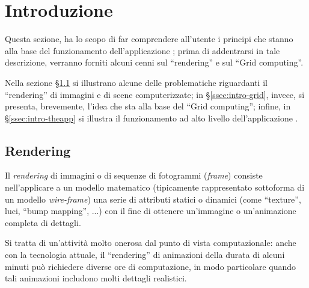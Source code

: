 
\section{Introduzione} \label{sec:intro}

Questa sezione, ha lo scopo di far comprendere all'utente i principi che stanno alla base del funzionamento dell'applicazione \mgTheApp{}; prima di addentrarsi in tale descrizione, verranno forniti alcuni cenni sul ``rendering'' e sul ``Grid computing''.

Nella sezione \S \ref{ssec:intro-render} si illustrano alcune delle problematiche riguardanti il ``rendering'' di immagini e di scene computerizzate; in \S \ref{ssec:intro-grid}, invece, si presenta, brevemente, l'idea che sta alla base del ``Grid computing''; infine, in \S \ref{ssec:intro-theapp} si illustra il funzionamento ad alto livello dell'applicazione \mgTheApp{}.

\subsection{Rendering} \label{ssec:intro-render}

Il \emph{rendering} di immagini o di sequenze di fotogrammi (\emph{frame}) consiste nell'applicare a un modello matematico (tipicamente rappresentato sottoforma di un modello \emph{wire-frame}) una serie di attributi statici o dinamici (come ``texture'', luci, ``bump mapping'', ...) con il fine di ottenere un'immagine o un'animazione completa di dettagli.

Si tratta di un'attivit\`a molto onerosa dal punto di vista computazionale: anche con la tecnologia attuale, il ``rendering'' di animazioni della durata di alcuni minuti pu\`o richiedere diverse ore di computazione, in modo particolare quando tali animazioni includono molti dettagli realistici.

